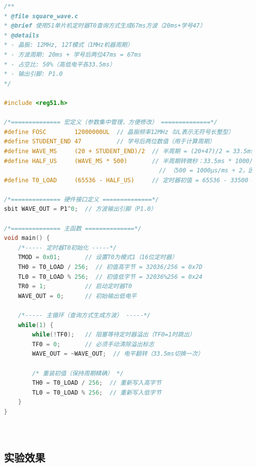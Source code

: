 \documentclass[12pt,hyperref,a4paper,UTF8]{ctexart}
\begin{document}
\begin{lstlisting}[language=C, caption={实验程序}]
/**
* @file square_wave.c
* @brief 使用51单片机定时器T0查询方式生成67ms方波（20ms+学号47）
* @details 
* - 晶振: 12MHz, 12T模式（1MHz机器周期）
* - 方波周期: 20ms + 学号后两位47ms = 67ms
* - 占空比: 50%（高低电平各33.5ms）
* - 输出引脚: P1.0
*/

#include <reg51.h>

/*============== 宏定义（参数集中管理，方便修改） ==============*/
#define FOSC        12000000UL  // 晶振频率12MHz（UL表示无符号长整型）
#define STUDENT_END 47          // 学号后两位数值（用于计算周期）
#define WAVE_MS     (20 + STUDENT_END)/2  // 半周期 = (20+47)/2 = 33.5ms
#define HALF_US     (WAVE_MS * 500)       // 半周期转微秒：33.5ms * 1000/2 = 33500μs
                                            // （500 = 1000μs/ms ÷ 2，因12T模式1μs/计数）
#define T0_LOAD     (65536 - HALF_US)     // 定时器初值 = 65536 - 33500 = 32036 (0x7D24)

/*============== 硬件接口定义 ==============*/
sbit WAVE_OUT = P1^0;  // 方波输出引脚（P1.0）

/*============== 主函数 ==============*/
void main() {
    /*----- 定时器T0初始化 -----*/
    TMOD = 0x01;       // 设置T0为模式1（16位定时器）
    TH0 = T0_LOAD / 256;  // 初值高字节 = 32036/256 = 0x7D
    TL0 = T0_LOAD % 256;  // 初值低字节 = 32036%256 = 0x24
    TR0 = 1;           // 启动定时器T0
    WAVE_OUT = 0;      // 初始输出低电平

    /*----- 主循环（查询方式生成方波） -----*/
    while(1) {
        while(!TF0);   // 阻塞等待定时器溢出（TF0=1时跳出）
        TF0 = 0;       // 必须手动清除溢出标志
        WAVE_OUT = ~WAVE_OUT;  // 电平翻转（33.5ms切换一次）
        
        /* 重装初值（保持周期精确） */
        TH0 = T0_LOAD / 256;  // 重新写入高字节
        TL0 = T0_LOAD % 256;  // 重新写入低字节
    }
}
   
    
\end{lstlisting}

\subsection{实验效果}
\end{document}
